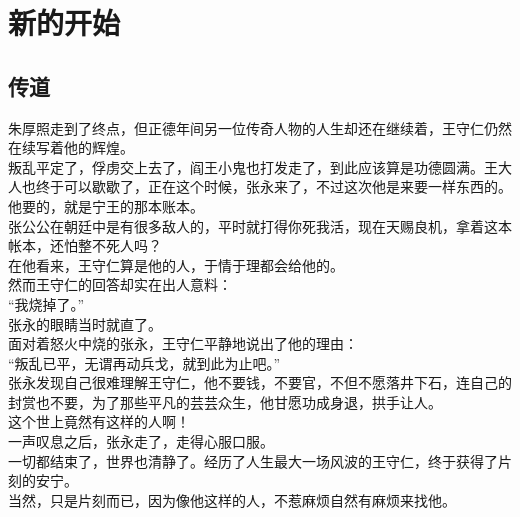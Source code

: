 \section{新的开始}
\ifnum{}
	\begin{multicols}{\theparacolNo}
\fi
\subsection{传道}
朱厚照走到了终点，但正德年间另一位传奇人物的人生却还在继续着，王守仁仍然在续写着他的辉煌。\\

叛乱平定了，俘虏交上去了，阎王小鬼也打发走了，到此应该算是功德圆满。王大人也终于可以歇歇了，正在这个时候，张永来了，不过这次他是来要一样东西的。\\

他要的，就是宁王的那本账本。\\

张公公在朝廷中是有很多敌人的，平时就打得你死我活，现在天赐良机，拿着这本帐本，还怕整不死人吗？\\

在他看来，王守仁算是他的人，于情于理都会给他的。\\

然而王守仁的回答却实在出人意料：\\

“我烧掉了。”\\

张永的眼睛当时就直了。\\

面对着怒火中烧的张永，王守仁平静地说出了他的理由：\\

“叛乱已平，无谓再动兵戈，就到此为止吧。”\\

张永发现自己很难理解王守仁，他不要钱，不要官，不但不愿落井下石，连自己的封赏也不要，为了那些平凡的芸芸众生，他甘愿功成身退，拱手让人。\\

这个世上竟然有这样的人啊！\\

一声叹息之后，张永走了，走得心服口服。\\

一切都结束了，世界也清静了。经历了人生最大一场风波的王守仁，终于获得了片刻的安宁。\\

当然，只是片刻而已，因为像他这样的人，不惹麻烦自然有麻烦来找他。\\


\end{multicols}
